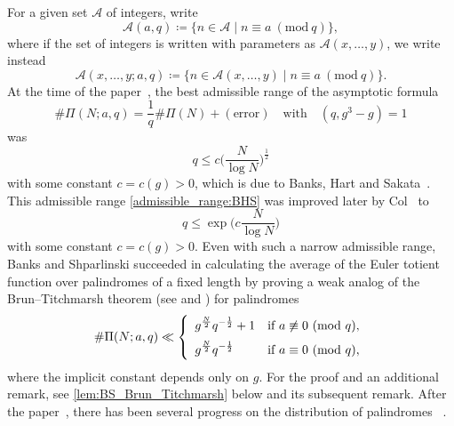 \documentclass{amsart}
\theoremstyle{plain}
\theoremstyle{definition}
\renewcommand{\mod}[1]{(\mathrm{mod}\ #1)}
\begin{document}
For a given set $\mathscr{A}$ of integers, write
\begin{equation}
\label{def:A_aq}
\mathscr{A}(a,q)
\coloneqq
\{
n\in\mathscr{A}
\mid
n\equiv a\ \mod{q}
\},
\end{equation}
where if the set of integers is written with parameters as $\mathscr{A}(x,\ldots,y)$, we write instead
\begin{equation}
\label{def:A_xy_aq}
\mathscr{A}(x,\ldots,y;a,q)
\coloneqq
\{
n\in\mathscr{A}(x,\ldots,y)
\mid
n\equiv a\ \mod{q}
\}.
\end{equation}
At the time of the paper~\cite{BanksShparlinski:PalindromePhi},
the best admissible range of the asymptotic formula
\[
\#\Pi(N;a,q)
=
\frac{1}{q}\#\Pi(N)+(\text{error})
\quad\text{with}\quad
(q,g^{3}-g)=1
\]
was
\begin{equation}
\label{admissible_range:BHS}
q\le c\biggl(\frac{N}{\log N}\biggr)^{\frac{1}{2}}
\end{equation}
with some constant $c=c(g)>0$,
which is due to Banks, Hart and Sakata~\cite[Proposition~4.2]{BHS}.
This admissible range \cref{admissible_range:BHS}
was improved later by Col~\cite[Th\'eor\`eme~1]{Col:PalindromeAP} to
\begin{equation}
\label{admissible_range:Col}
q\le\exp\biggl(c\frac{N}{\log N}\biggr)
\end{equation}
with some constant $c=c(g)>0$.
Even with such a narrow admissible range,
Banks and Shparlinski succeeded in calculating the average of the Euler totient function
over palindromes of a fixed length by proving a weak analog of the Brun--Titchmarsh theorem
(see \cite[Theorem~7]{BanksShparlinski:PrimeDivisorPalindrome}
and \cite[Lemma~2]{BanksShparlinski:PalindromePhi})
for palindromes
\begin{equation}
\label{Banks_Shparlinski_BT}
\#\Pi(N;a,q)
\ll
\left\{
\begin{array}{>{\displaystyle}ll}
g^{\frac{N}{2}}q^{-\frac{1}{2}}+1&\text{if $a\not\equiv0\ \mod{q}$},\\[2mm]
g^{\frac{N}{2}}q^{-\frac{1}{2}}&\text{if $a\equiv0\ \mod{q}$},
\end{array}
\right.
\end{equation}
where the implicit constant depends only on $g$.
For the proof and an additional remark,
see \cref{lem:BS_Brun_Titchmarsh} below and its subsequent remark.
After the paper~\cite{BanksShparlinski:PalindromePhi},
there has been several progress on the distribution of palindromes
~\cite{Col:PalindromeAP,TuxanidyPanario}.
\end{document}
